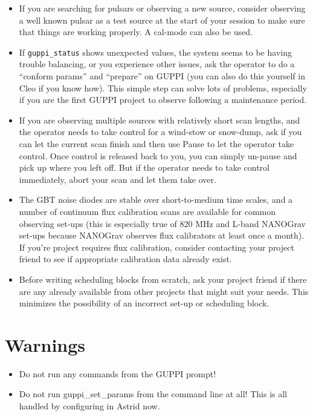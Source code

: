\begin{itemize}
\item{If you are searching for pulsars or observing a new source,
    consider observing a well known pulsar as a test source at the
    start of your session to make sure that things are working
    properly.  A cal-mode can also be used.}
\item{If \texttt{guppi\_status} shows unexpected values, the system
    seems to be having trouble balancing, or you experience other
    issues, ask the operator to do a ``conform params'' and
    ``prepare'' on GUPPI (you can also do this yourself in Cleo if you
    know how).  This simple step can solve lots of problems,
    especially if you are the first GUPPI project to observe following
    a maintenance period.}
\item{If you are observing multiple sources with relatively short scan
    lengths, and the operator needs to take control for a wind-stow or
    snow-dump, ask if you can let the current scan finish and then use
    Pause to let the operator take control.  Once control is released
    back to you, you can simply un-pause and pick up where you left
    off.  But if the operator needs to take control immediately, abort
    your scan and let them take over.}
\item{The GBT noise diodes are stable over short-to-medium time
    scales, and a number of continuum flux calibration scans are
    available for common observing set-ups (this is especially true of
    820 MHz and L-band NANOGrav set-ups because NANOGrav observes flux
    calibrators at least once a month).  If you're project requires
    flux calibration, consider contacting your project friend to see
    if appropriate calibration data already exist.}
\item{Before writing scheduling blocks from scratch, ask your project
    friend if there are any already available from other projects that
    might suit your needs.  This minimizes the possibility of an
    incorrect set-up or scheduling block.}
\end{itemize}

\section{Warnings}
\label{sec:warnings}
\begin{itemize}
\item{Do not run any commands from the GUPPI prompt!}
\item{Do not run guppi\_set\_params from the command line at all! This
    is all handled by configuring in Astrid now.}
\end{itemize}

